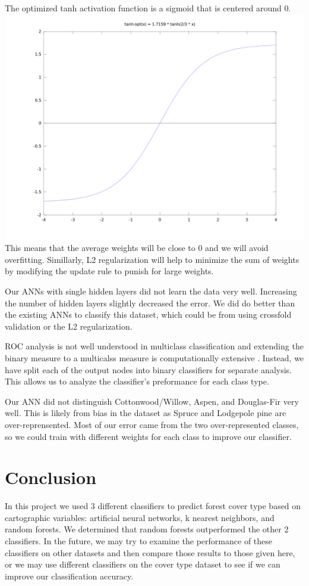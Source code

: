 \documentclass[11pt]{article}
\begin{document}
The optimized tanh activation function is a sigmoid that is centered around 0.\\
\includegraphics[width=\linewidth]{images/tanh}
This means that the average weights will be close to 0 and we will avoid overfitting.  Simillarly, L2 regularization will help to minimize the sum of weights by modifying the update rule to punish for large weights.  
\par
Our ANNs with single hidden layers did not learn the data very well.  Increasing the number of hidden layers slightly decreased the error.  We did do better than the existing ANNs to classify this dataset, which could be from using crossfold validation or the L2 regularization.  
\par
ROC analysis is not well understood in multiclass classification and extending the binary measure to a multicalss measure is computationally extensive \cite{lan07}.  Instead, we have split each of the output nodes into binary classifiers for separate analysis.  This allows us to analyze the classifier's preformance for each class type.
\par
Our ANN did not distinguish Cottonwood/Willow, Aspen, and Douglas-Fir very well.  This is likely from bias in the dataset as Spruce and Lodgepole pine are over-reprensented.  Most of our error came from the two over-represented classes, so we could train with different weights for each class to improve our classifier. 

\section{Conclusion}
In this project we used 3 different classifiers to predict forest cover type based on cartographic variables: artificial neural networks, k nearest neighbors, and random forests. We determined that random forests outperformed the other 2 classifiers. In the future, we may try to examine the performance of these classifiers on other datasets and then compare those results to those given here, or we may use different classifiers on the cover type dataset to see if we can improve our classification accuracy.
\end{document}
